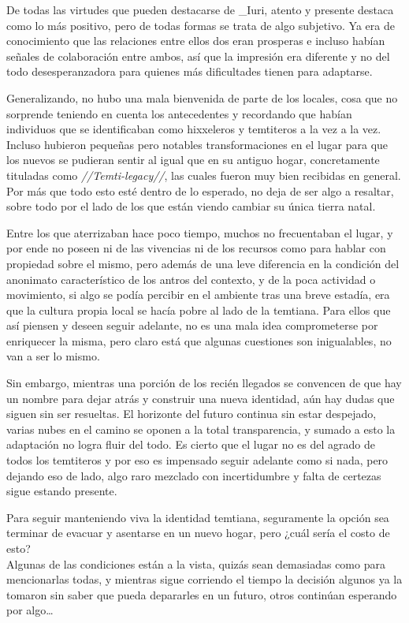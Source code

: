 \documentclass[
  spanish,
]{book}
\begin{document}
De todas las virtudes que pueden destacarse de \_Iuri, atento y presente destaca como lo más positivo, pero de todas formas se trata de algo subjetivo. Ya era de conocimiento que las relaciones entre ellos dos eran prosperas e incluso habían señales de colaboración entre ambos, así que la impresión era diferente y no del todo desesperanzadora para quienes más dificultades tienen para adaptarse.

Generalizando, no hubo una mala bienvenida de parte de los locales, cosa que no sorprende teniendo en cuenta los antecedentes y recordando que habían individuos que se identificaban como hixxeleros y temtiteros a la vez a la vez. Incluso hubieron pequeñas pero notables transformaciones en el lugar para que los nuevos se pudieran sentir al igual que en su antiguo hogar, concretamente tituladas como \emph{//Temti-legacy//}, las cuales fueron muy bien recibidas en general. Por más que todo esto esté dentro de lo esperado, no deja de ser algo a resaltar, sobre todo por el lado de los que están viendo cambiar su única tierra natal.

Entre los que aterrizaban hace poco tiempo, muchos no frecuentaban el lugar, y por ende no poseen ni de las vivencias ni de los recursos como para hablar con propiedad sobre el mismo, pero además de una leve diferencia en la condición del anonimato característico de los antros del contexto, y de la poca actividad o movimiento, si algo se podía percibir en el ambiente tras una breve estadía, era que la cultura propia local se hacía pobre al lado de la temtiana. Para ellos que así piensen y deseen seguir adelante, no es una mala idea comprometerse por enriquecer la misma, pero claro está que algunas cuestiones son inigualables, no van a ser lo mismo.

Sin embargo, mientras una porción de los recién llegados se convencen de que hay un nombre para dejar atrás y construir una nueva identidad, aún hay dudas que siguen sin ser resueltas. El horizonte del futuro continua sin estar despejado, varias nubes en el camino se oponen a la total transparencia, y sumado a esto la adaptación no logra fluir del todo. Es cierto que el lugar no es del agrado de todos los temtiteros y por eso es impensado seguir adelante como si nada, pero dejando eso de lado, algo raro mezclado con incertidumbre y falta de certezas sigue estando presente.

Para seguir manteniendo viva la identidad temtiana, seguramente la opción sea terminar de evacuar y asentarse en un nuevo hogar, pero ¿cuál sería el costo de esto?\\
Algunas de las condiciones están a la vista, quizás sean demasiadas como para mencionarlas todas, y mientras sigue corriendo el tiempo la decisión algunos ya la tomaron sin saber que pueda depararles en un futuro, otros continúan esperando por algo\ldots{}
\end{document}
